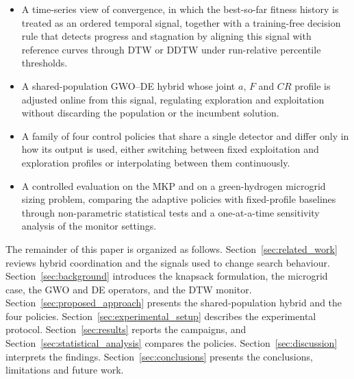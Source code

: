 \begin{itemize}

\item A time-series view of convergence, in which the best-so-far fitness history is treated as an ordered temporal signal, together with a training-free decision rule that detects progress and stagnation by aligning this signal with reference curves through DTW or DDTW under run-relative percentile thresholds.

\item A shared-population GWO--DE hybrid whose joint $a$, $F$ and $CR$ profile is adjusted online from this signal, regulating exploration and exploitation without discarding the population or the incumbent solution.

\item A family of four control policies that share a single detector and differ only in how its output is used, either switching between fixed exploitation and exploration profiles or interpolating between them continuously.

\item A controlled evaluation on the MKP and on a green-hydrogen microgrid sizing problem, comparing the adaptive policies with fixed-profile baselines through non-parametric statistical tests and a one-at-a-time sensitivity analysis of the monitor settings.
\end{itemize}

The remainder of this paper is organized as follows. Section~\ref{sec:related_work} reviews hybrid coordination and the signals used to change search behaviour. Section~\ref{sec:background} introduces the knapsack formulation, the microgrid case, the GWO and DE operators, and the DTW monitor. Section~\ref{sec:proposed_approach} presents the shared-population hybrid and the four policies. Section~\ref{sec:experimental_setup} describes the experimental protocol. Section~\ref{sec:results} reports the campaigns, and Section~\ref{sec:statistical_analysis} compares the policies. Section~\ref{sec:discussion} interprets the findings. Section~\ref{sec:conclusions} presents the conclusions, limitations and future work.
